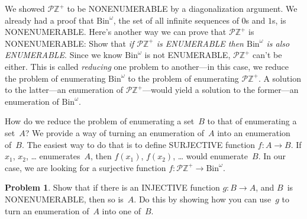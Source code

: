 \documentclass[10pt,a4paper]{article}
\newcommand*{\olup}[1]{\MakeUppercase{#1}}
\theoremstyle{plain}
\theoremstyle{definition}
\newtheorem{prob}{Problem}[section]
\theoremstyle{remark}
\providecommand{\PosInt}{\mathbb{Z}^{+}}
\providecommand{\Bin}{\mathrm{Bin}}
\providecommand{\Pow}{\mathcal{P}}
\begin{document}
We showed $\Pow{\PosInt}$ to be \olup{nonenumerable} by a diagonalization
argument. We already had a proof that $\Bin^\omega$, the set of all
infinite sequences of $0$s and $1$s, is \olup{nonenumerable}.  Here's
another way we can prove that $\Pow{\PosInt}$ is \olup{nonenumerable}:
Show that \emph{if $\Pow{\PosInt}$ is \olup{enumerable} then $\Bin^\omega$
  is also \olup{enumerable}}.  Since we know $\Bin^\omega$ is not
\olup{enumerable}, $\Pow{\PosInt}$ can't be either.  This is called
\emph{reducing} one problem to another---in this case, we reduce the
problem of enumerating $\Bin^\omega$ to the problem of enumerating
$\Pow{\PosInt}$.  A solution to the latter---an enumeration of
$\Pow{\PosInt}$---would yield a solution to the former---an enumeration
of $\Bin^\omega$.

How do we reduce the problem of enumerating a set~$B$ to that of
enumerating a set~$A$?  We provide a way of turning an enumeration
of~$A$ into an enumeration of~$B$.  The easiest way to do that is to
define \olup{surjective} function $f\colon A \to B$.  If $x_1$, $x_2$,
\dots{} enumerates~$A$, then $f(x_1)$, $f(x_2)$, \dots{} would
enumerate~$B$.  In our case, we are looking for a surjective
function $f\colon \Pow{\PosInt} \to \Bin^\omega$.

\begin{prob}
Show that if there is an \olup{injective} function $g\colon B \to A$, and
$B$~is \olup{nonenumerable}, then so is~$A$. Do this by showing how you
can use~$g$ to turn an enumeration of~$A$ into one of~$B$.
\end{prob}
\end{document}
